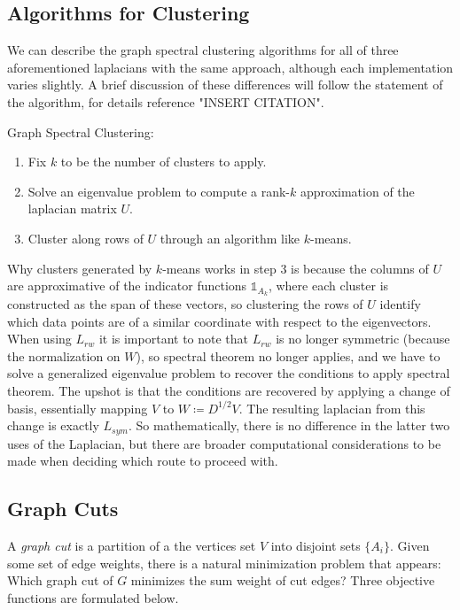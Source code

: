 \documentclass[letterpaper,12pt]{article}
\newcommand{\an}[1]{{\leavevmode\color{red}{#1}}}
\begin{document}
\subsection{Algorithms for Clustering}
We can describe the graph spectral clustering algorithms for all of three aforementioned laplacians with the same approach, although each implementation varies slightly. A brief discussion of these differences will follow the statement of the algorithm, for details reference "INSERT CITATION".

\noindent
Graph Spectral Clustering:
\begin{enumerate}
	\item Fix $k$ to be the number of clusters to apply.
        \item Solve an eigenvalue problem to compute a rank-$k$ approximation of the laplacian matrix $U$. \an{$U$ is not a rank-$k$ approximation.}
        \item Cluster along rows of $U$ through an algorithm like $k$-means. \an{You could more clearly describe what this is.}
\end{enumerate}

\noindent
Why clusters generated by $k$-means works in step 3 is because the columns of $U$ are approximative of the indicator functions $\mathds{1}_{A_k}$, where each cluster is constructed as the span of these vectors, so clustering the rows of $U$ identify which data points are of a similar coordinate with respect to the eigenvectors. When using $L_{rw}$ it is important to note that $L_{rw}$ is no longer symmetric (because the normalization on $W$), so spectral theorem no longer applies, and we have to solve a generalized eigenvalue problem to recover the conditions to apply spectral theorem. \an{You haven't introduce any generalized eigenvalue problems.} The upshot is that the conditions are recovered by applying a change of basis, essentially mapping $V$ to $W\coloneqq D^{1/2}V$. The resulting laplacian from this change is exactly $L_{sym}$. \an{You should show this.} So mathematically, there is no difference in the latter two uses of the Laplacian, but there are broader computational considerations to be made when deciding which route to proceed with.

\subsection*{Graph Cuts}
A \textit{graph cut} is a partition of a the vertices set $V$ into disjoint sets $\{A_i\}$. Given some set of edge weights, there is a natural minimization problem that appears: Which graph cut of $G$ minimizes the sum weight of cut edges? Three objective functions are formulated below.
\end{document}
